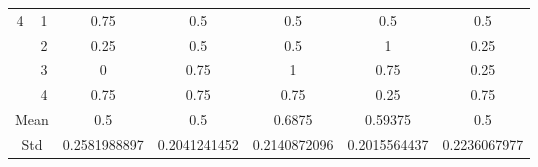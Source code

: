 \documentclass[draft,dvipsnames]{drexel-thesis}
\begin{document}
\begin{thesis}
\begin{table}[!t]
\begin{tabular}{|c|c|c|c|c|c|c|}
\multirow{4}{*}{4}    & 1                   & 0.75         & 0.5          & 0.5          & 0.5          & 0.5          \\ \cline{2-7} 
                      & 2                   & 0.25         & 0.5          & 0.5          & 1            & 0.25         \\ \cline{2-7} 
                      & 3                   & 0            & 0.75         & 1            & 0.75         & 0.25         \\ \cline{2-7} 
                      & 4                   & 0.75         & 0.75         & 0.75         & 0.25         & 0.75         \\ \hline
\multicolumn{2}{|c|}{Mean}                  & 0.5          & 0.5          & 0.6875       & 0.59375      & 0.5          \\ \hline
\multicolumn{2}{|c|}{Std}                   & 0.2581988897 & 0.2041241452 & 0.2140872096 & 0.2015564437 & 0.2236067977 \\ \hline
\end{tabular}
\end{table}


\end{thesis}
\end{document}
